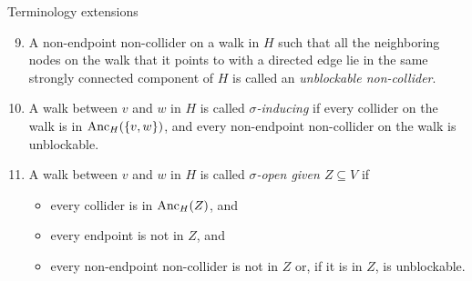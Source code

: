 \begin{frame}[t]{Terminology extensions}
  \begin{Def}
  \begin{enumerate}
    \setcounter{enumi}{8}
    \item A non-endpoint non-collider on a walk in $H$ such that all the neighboring nodes on the walk that it points to with a directed edge lie in the same strongly connected component of $H$ is called an \emph{unblockable non-collider}.
    \item A walk between $v$ and $w$ in $H$ is called \emph{$\sigma$-inducing} if every collider on the walk is in $\mathrm{Anc}_H(\{v,w\})$, and every non-endpoint non-collider on the walk is unblockable.
    \item A walk between $v$ and $w$ in $H$ is called \emph{$\sigma$-open given $Z \subseteq V$} if 
      \begin{itemize}
        \item every collider is in $\mathrm{Anc}_H(Z)$, and
        \item every endpoint is not in $Z$, and
        \item every non-endpoint non-collider is not in $Z$ or, if it is in $Z$, is unblockable.
      \end{itemize}
  \end{enumerate}
\end{Def}
\end{frame}

